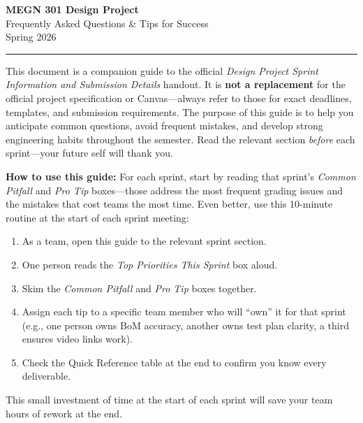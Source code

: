 \documentclass[11pt,letterpaper]{article}
\begin{document}
\begin{center}
    {\LARGE\bfseries\textcolor{minesblue}{MEGN 301 Design Project}}\\[6pt]
    {\Large\textcolor{minesblue!70}{Frequently Asked Questions \& Tips for Success}}\\[8pt]
    {\large Spring 2026}\\[4pt]
    \textcolor{minesgold}{\rule{0.6\textwidth}{2pt}}
\end{center}

\vspace{0.5cm}

\noindent This document is a companion guide to the official \textit{Design Project Sprint Information and Submission Details} handout. It is \textbf{not a replacement} for the official project specification or Canvas---always refer to those for exact deadlines, templates, and submission requirements. The purpose of this guide is to help you anticipate common questions, avoid frequent mistakes, and develop strong engineering habits throughout the semester. Read the relevant section \textit{before} each sprint---your future self will thank you.

\begin{tcolorbox}[colback=minesgold!10, colframe=minesgold!70!black, boxrule=0.6pt, arc=2pt, left=6pt, right=6pt, top=4pt, bottom=4pt]
\textbf{How to use this guide:} For each sprint, start by reading that sprint's \textit{Common Pitfall} and \textit{Pro Tip} boxes---those address the most frequent grading issues and the mistakes that cost teams the most time. Even better, use this 10-minute routine at the start of each sprint meeting:
\begin{enumerate}[leftmargin=*, itemsep=2pt, topsep=4pt]
    \item As a team, open this guide to the relevant sprint section.
    \item One person reads the \textit{Top Priorities This Sprint} box aloud.
    \item Skim the \textit{Common Pitfall} and \textit{Pro Tip} boxes together.
    \item Assign each tip to a specific team member who will ``own'' it for that sprint (e.g., one person owns BoM accuracy, another owns test plan clarity, a third ensures video links work).
    \item Check the Quick Reference table at the end to confirm you know every deliverable.
\end{enumerate}
\vspace{-4pt}
This small investment of time at the start of each sprint will save your team hours of rework at the end.
\end{tcolorbox}
\end{document}
